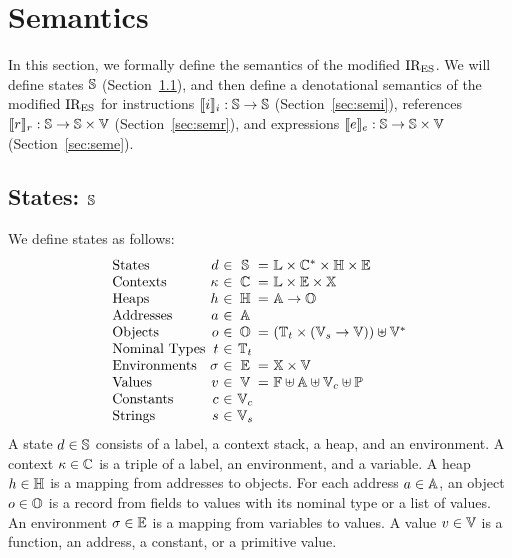 \section{Semantics}\label{sec:semantics}
In this section, we formally define the semantics of the modified ${\text{IR}_\text{ES}}$.  We
will define states $\mathbb{S}$ (Section~\ref{sec:state}), and then define a
denotational semantics of the modified ${\text{IR}_\text{ES}}$ for instructions $\llbracket{i}\rrbracket_i:
\mathbb{S} \rightarrow \mathbb{S}$ (Section~\ref{sec:semi}), references $\llbracket{r}\rrbracket_r: \mathbb{S}
\rightarrow \mathbb{S} \times \mathbb{V}$ (Section~\ref{sec:semr}), and expressions
$\llbracket{e}\rrbracket_e: \mathbb{S} \rightarrow \mathbb{S} \times \mathbb{V}$ (Section~\ref{sec:seme}).


\subsection{States: $\mathbb{S}$}\label{sec:state}
We define states as follows:
\[
  \vspace*{-1em}
  \begin{array}{l@{~}r@{~}c@{~}c@{~}r@{~}l}
    \text{States}
    &\elem&\in&\dom&=& \labset \times \ctxtset^* \times \heapset \times \envset\\

    \text{Contexts}
    &\ctxt&\in&\ctxtset&=& \labset \times \envset \times \varset\\

    \text{Heaps}
    &\heap&\in&\heapset&=& \addrset \rightarrow \objset\\

    \text{Addresses}
    &\addr&\in&\addrset\\

    \text{Objects}
    &\obj&\in&\objset&=& (\tnameset \times (\strset \rightarrow \valset)) \uplus
    \valset^*\\

    \text{Nominal Types}
    &\tname&\in&\tnameset\\

    \text{Environments}
    &\env&\in&\envset&=& \varset \times \valset\\

    \text{Values}
    &\val&\in&\valset&=& \funcset \uplus \addrset \uplus \constset \uplus \primset\\

    \text{Constants}
    &\const&\in&\constset\\

    \text{Strings}
    &\str&\in&\strset\\
  \end{array}
  \vspace*{1em}
\]
A state $d \in \mathbb{S}$ consists of a label, a context stack, a heap, and an
environment.  A context $\kappa \in \mathbb{C}$ is a triple of a label, an
environment, and a variable.  A heap $h \in \mathbb{H}$ is a mapping from
addresses to objects.  For each address $a \in \mathbb{A}$, an object $o
\in \mathbb{O}$ is a record from fields to values with its nominal type or a list
of values.  An environment $\sigma \in \mathbb{E}$ is a mapping from variables to
values.  A value $v \in \mathbb{V}$ is a function, an address, a constant, or a
primitive value.

